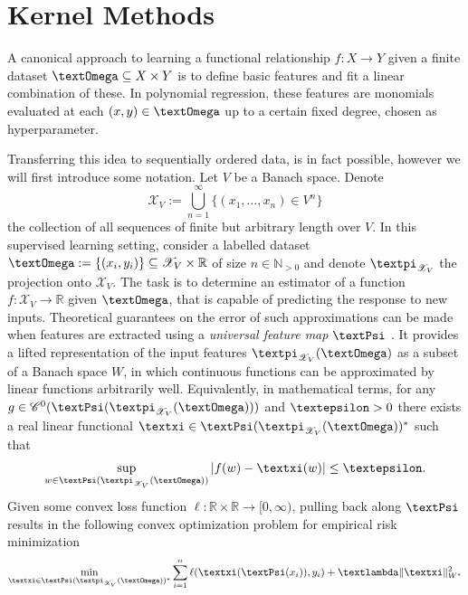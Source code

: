 \documentclass[openany]{book}
\begin{document}
\section{Kernel Methods}
A canonical approach to learning a functional relationship $f:X\to Y$ given a finite dataset $\gOmega\subseteq X\times Y$ is to define basic features and fit a linear combination of these. In polynomial regression, these features are monomials evaluated at each $(x,y)\in \gOmega$ up to a certain fixed degree, chosen as hyperparameter. 
\par Transferring this idea to sequentially ordered data, is in fact possible, however we will first introduce some notation. Let $V$ be a Banach space. Denote
\begin{equation*}
    \mathscr X_V:= \bigcup_{n=1}^\infty\{(x_1,\dots,x_n)\in V^n\}
\end{equation*}
the collection of all sequences of finite but arbitrary length over $V$. In this supervised learning setting, consider a labelled dataset $\gOmega:=\{(x_i,y_i)\}\subseteq \mathscr X_V\times \mathbb R$ of size $n\in \mathbb N_{>0}$ and denote $\gpi_{\mathscr X_V}$ the projection onto $\mathscr X_V$. The task is to determine an estimator of a function $f:\mathscr X_V\to \mathbb R$ given $\gOmega$, that is capable of predicting the response to new inputs. 
Theoretical guarantees on the error of such approximations can be made when features are extracted using a \textit{universal feature map} $\gPsi$ \cite{lyons2022}. It provides a lifted representation of the input features $\gpi_{\mathscr X_V}(\gOmega)$ as a subset of a Banach space $W$, in which continuous functions can be approximated by linear functions arbitrarily well. Equivalently, in mathematical terms, for any $g\in \mathscr C^0(\gPsi(\gpi_{\mathscr X_V}(\gOmega)))$ and $\gepsilon>0$ there exists a real linear functional $\gxi\in \gPsi(\gpi_{\mathscr X_V}(\gOmega))^\ast$ such that
\begin{equation*}
    \sup_{w\in \gPsi(\gpi_{\mathscr X_V}(\gOmega))}\vert f(w)-\gxi(w)\vert \leq \gepsilon.
\end{equation*}
Given some convex loss function $\ell:\mathbb R\times \mathbb R\to [0,\infty)$, pulling back along $\gPsi$ results in the following convex optimization problem for empirical risk minimization
\begin{equation}\label{rkhs-min-problem}
    \min_{\gxi\in \gPsi(\gpi_{\mathscr X_V}(\gOmega))^\ast} \sum_{i=1}^n\ell(\gxi(\gPsi(x_i)),y_i)+\glambda \|\gxi\|^2_{W^\ast}
\end{equation}
\end{document}
